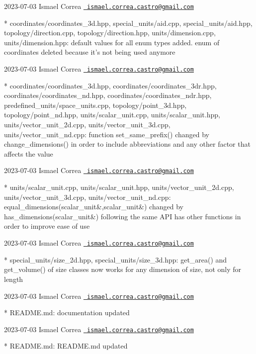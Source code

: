  2023-\/07-\/03 Ismael Correa \href{mailto:ismael.correa.castro@gmail.com}{\texttt{ ismael.\+correa.\+castro@gmail.\+com}} \begin{DoxyVerb}* coordinates/coordinates_3d.hpp, special_units/aid.cpp,
special_units/aid.hpp, topology/direction.cpp,
topology/direction.hpp, units/dimension.cpp, units/dimension.hpp: 
default values for all enum types added. enum of coordinates deleted
because it's not being used anymore
\end{DoxyVerb}
 2023-\/07-\/03 Ismael Correa \href{mailto:ismael.correa.castro@gmail.com}{\texttt{ ismael.\+correa.\+castro@gmail.\+com}} \begin{DoxyVerb}* coordinates/coordinates_3d.hpp, coordinates/coordinates_3dr.hpp,
coordinates/coordinates_nd.hpp, coordinates/coordinates_ndr.hpp,
predefined_units/space_units.cpp, topology/point_3d.hpp,
topology/point_nd.hpp, units/scalar_unit.cpp,
units/scalar_unit.hpp, units/vector_unit_2d.cpp,
units/vector_unit_3d.cpp, units/vector_unit_nd.cpp: function
set_same_prefix() changed by change_dimensions() in order to include
abbreviations and any other factor that affects the value
\end{DoxyVerb}
 2023-\/07-\/03 Ismael Correa \href{mailto:ismael.correa.castro@gmail.com}{\texttt{ ismael.\+correa.\+castro@gmail.\+com}} \begin{DoxyVerb}* units/scalar_unit.cpp, units/scalar_unit.hpp,
units/vector_unit_2d.cpp, units/vector_unit_3d.cpp,
units/vector_unit_nd.cpp: 
equal_dimensions(scalar_unit&,scalar_unit&) changed by
has_dimensions(scalar_unit&) following the same API has other
functions in order to improve ease of use
\end{DoxyVerb}
 2023-\/07-\/03 Ismael Correa \href{mailto:ismael.correa.castro@gmail.com}{\texttt{ ismael.\+correa.\+castro@gmail.\+com}} \begin{DoxyVerb}* special_units/size_2d.hpp, special_units/size_3d.hpp: get_area()
and get_volume() of size classes now works for any dimension of
size, not only for length
\end{DoxyVerb}
 2023-\/07-\/03 Ismael Correa \href{mailto:ismael.correa.castro@gmail.com}{\texttt{ ismael.\+correa.\+castro@gmail.\+com}} \begin{DoxyVerb}* README.md: documentation updated
\end{DoxyVerb}
 2023-\/07-\/03 Ismael Correa \href{mailto:ismael.correa.castro@gmail.com}{\texttt{ ismael.\+correa.\+castro@gmail.\+com}} \begin{DoxyVerb}* README.md: README.md updated
\end{DoxyVerb}

